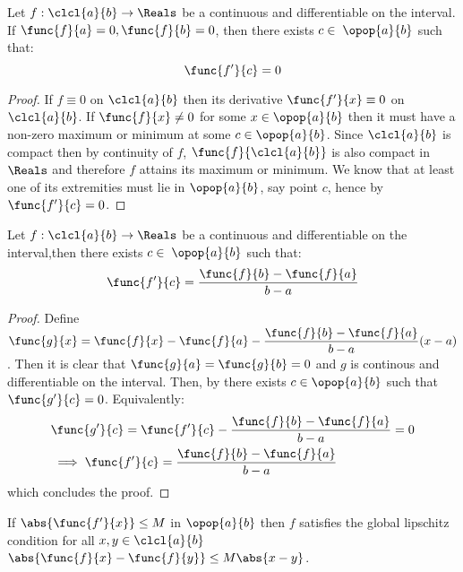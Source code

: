 \begin{theorem} \label{Rolle}
    Let \(f: \clcl{a}{b}\to \Reals\) be a continuous and differentiable on the interval. If \(\func{f}{a} = 0, \func{f}{b} = 0\), then there exists \(c \in \; \opop{a}{b}\) such that:
    \begin{equation*}
        \func{f'}{c} = 0
    \end{equation*}
\end{theorem}
\begin{proof}
    If \(f \equiv 0\) on \(\clcl{a}{b}\) then its derivative \(\func{f'}{x} \equiv 0\) on \(\clcl{a}{b}\). If \(\func{f}{x} \neq 0\) for some \(x \in \opop{a}{b}\) then it must have a non-zero maximum or minimum at some \(c \in \opop{a}{b}\). Since \(\clcl{a}{b}\) is compact then by continuity of \(f\), \(\func{f}{\clcl{a}{b}}\) is also compact in \(\Reals\) and therefore \(f\) attains its maximum or minimum. We know that at least one of its extremities must lie in \(\opop{a}{b}\), say point \(c\), hence by  \(\func{f'}{c} = 0\).
\end{proof}
\begin{theorem}\label{MVT}
    Let \(f: \clcl{a}{b} \to \Reals\) be a continuous and differentiable on the interval,then there exists \(c \in \; \opop{a}{b}\) such that:
    \begin{equation*}
        \func{f'}{c} = \dfrac{\func{f}{b} - \func{f}{a}}{b - a}
    \end{equation*}
\end{theorem}
\begin{proof}
    Define \(\func{g}{x} = \func{f}{x}  - \func{f}{a} - \dfrac{\func{f}{b} - \func{f}{a}}{b-a}(x-a)\). Then it is clear that \(\func{g}{a} = \func{g}{b} = 0\) and \(g\) is continous and differentiable on the interval. Then, by  there exists \(c \in \opop{a}{b}\) such that \(\func{g'}{c} = 0\). Equivalently:
    \begin{align*}
         & \func{g'}{c} = \func{f'}{c} -  \dfrac{\func{f}{b} - \func{f}{a}}{b-a} = 0 \\
         & \implies \func{f'}{c} =  \dfrac{\func{f}{b} - \func{f}{a}}{b-a}
    \end{align*}
    which concludes the proof.
\end{proof}
\begin{corollary}
    If \(\abs{\func{f'}{x}} \leq M \) in \(\opop{a}{b}\) then \(f\) satisfies the global lipschitz condition for all \(x,y \in \clcl{a}{b}\) \(\abs{\func{f}{x} - \func{f}{y} }\leq M \abs{x- y}  \).
\end{corollary}
